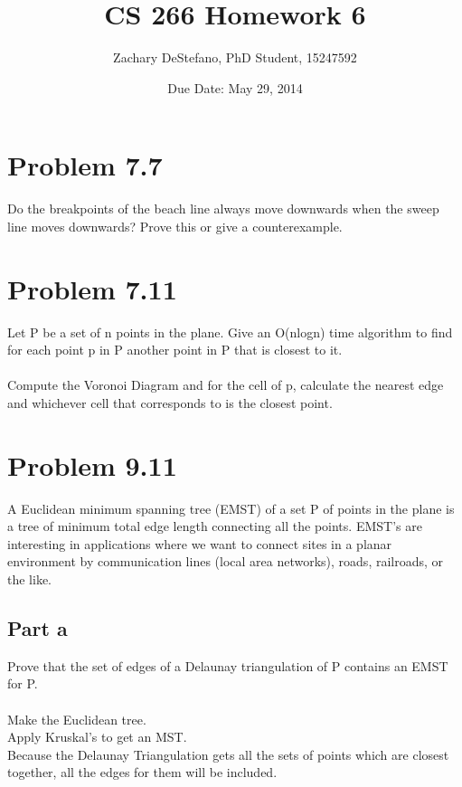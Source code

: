\documentclass[11pt,psfig]{article}
\begin{document}
\setlength{\parskip}{1.2ex plus0.3ex minus 0.3ex}


\thispagestyle{empty} \pagestyle{myheadings} 



\title{CS 266 Homework 6}
\author{Zachary DeStefano, PhD Student, 15247592}
\date{Due Date: May 29, 2014}

\maketitle

\vfill\eject

\section*{Problem 7.7}
Do the breakpoints of the beach line always move downwards when the
sweep line moves downwards? Prove this or give a counterexample.

\section*{Problem 7.11}

Let P be a set of n points in the plane. Give an O(nlogn) time algorithm
to find for each point p in P another point in P that is closest to it.\\
\\
Compute the Voronoi Diagram and for the cell of p, calculate the nearest edge and whichever cell that corresponds to is the closest point. 

\section*{Problem 9.11}

A Euclidean minimum spanning tree (EMST) of a set P of points in the
plane is a tree of minimum total edge length connecting all the points.
EMST’s are interesting in applications where we want to connect sites
in a planar environment by communication lines (local area networks),
roads, railroads, or the like.\\

\subsection*{Part a}
Prove that the set of edges of a Delaunay triangulation of P contains
an EMST for P.\\
\\
Make the Euclidean tree. \\
Apply Kruskal's to get an MST. \\
Because the Delaunay Triangulation gets all the sets of points which are closest together, all the edges for them will be included. 
\end{document}

